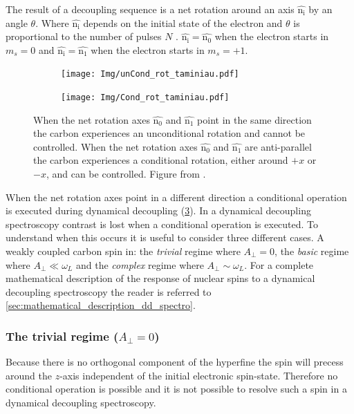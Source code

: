The result of a decoupling sequence is a net rotation around an axis $\bm{\hat{\mathrm{n_i}}}$ by an angle $\theta$.
Where $\bm{\hat{\mathrm{n_i}}}$ depends on the initial state of the electron and $\theta$ is proportional to the number of pulses $N$ \citep{Taminiau2012Detection}.
$\bm{\hat{\mathrm{n_i}}} =\bm{\hat{\mathrm{n_0}}}$ when the electron starts in $m_s = 0$ and $\bm{\hat{\mathrm{n_i}}} =\bm{\hat{\mathrm{n_1}}}$ when the electron starts in $m_s = +1$.

\begin{figure}[htbp]
    \begin{subfigure}[t]{0.49\textwidth}\centering
        \centering
        \caption{}
        \texttt{[image: Img/unCond\_rot\_taminiau.pdf]}
        \label{fig:uncond_rot}
    \end{subfigure}
    \begin{subfigure}[t]{0.49\textwidth}\centering
        \centering
        \caption{}
        \texttt{[image: Img/Cond\_rot\_taminiau.pdf]}
        \label{fig:cond_rot}
    \end{subfigure}
    \caption{ When the net rotation axes $\bm{\hat{\mathrm{n_0}}}$ and $\bm{\hat{\mathrm{n_1}}}$ point in the same direction the carbon experiences an unconditional rotation and cannot be controlled.  When the net rotation axes $\bm{\hat{\mathrm{n_0}}}$ and $\bm{\hat{\mathrm{n_1}}}$ are anti-parallel the carbon experiences a conditional rotation, either around $+x$ or $-x$, and can be controlled. Figure from \citep{Taminiau2012Detection}.}
    \label{fig:conditional_and_unconditional_rotation}
\end{figure}

When the net rotation axes point in a different direction a conditional operation is executed during dynamical decoupling (\cref{fig:conditional_and_unconditional_rotation}).
In a dynamical decoupling spectroscopy contrast is lost when a conditional operation is executed.
To understand when this occurs it is useful to consider three different cases.
A weakly coupled carbon spin in: the \emph{trivial} regime where $A_\perp=0$, the \emph{basic} regime where $A_\perp \ll \omega_L$ and the \emph{complex} regime where $A_\perp \sim \omega_L$.
For a complete mathematical description of the response of nuclear spins to a dynamical decoupling spectroscopy the reader is referred to \cref{sec:mathematical_description_dd_spectro}.

\subsubsection{The trivial regime ($A_\perp=0$)}
Because there is no orthogonal component of the hyperfine the spin will precess around the $z$-axis independent of the initial electronic spin-state.
Therefore no conditional operation is possible and it is not possible to resolve such a spin in a dynamical decoupling spectroscopy.

